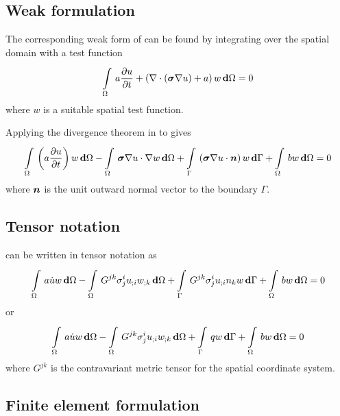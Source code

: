 \subsection{Weak formulation}

The corresponding weak form of  can be found by
integrating over the spatial domain with a test function \ie
\begin{equation}
  \gint{\Omega}{}{a\delby{u}{t}+\pbrac{\divergence{}{\pbrac{\tensor{\sigma}
          \gradient{}{u}}}+a}w}{\Omega}=0
  \label{eqn:diffusionweakform1}
\end{equation}
where $w$ is a suitable spatial test function.

Applying the divergence theorem in 
to  gives
\begin{equation}
  \gint{\Omega}{}{\pbrac{a\delby{u}{t}}w}{\Omega}-
      \gint{\Omega}{}{\dotprod{\tensor{\sigma}\gradient{}{u}}{\gradient{}{w}}}{\Omega}
      +\gint{\Gamma}{}{\pbrac{\dotprod{\tensor{\sigma}\gradient{}{u}}{\normal}}w}{\Gamma}+
      \gint{\Omega}{}{bw}{\Omega}=0
  \label{eqn:diffusionweakform2}
\end{equation}
where $\boldsymbol{n}$ is the unit outward normal vector to the boundary $\Gamma$.

\subsection{Tensor notation}

 can be written in tensor notation as
\begin{equation}
  \gint{\Omega}{}{a\dot{u}w}{\Omega}-
  \gint{\Omega}{}{G^{jk}\sigma^{i}_{j}\covarderiv{u}{i}\covarderiv{w}{k}}{\Omega}+
  \gint{\Gamma}{}{G^{jk}\sigma^{i}_{j}\covarderiv{u}{i}n_{k}w}{\Gamma} +
  \gint{\Omega}{}{bw}{\Omega}=0
  \label{eqn:diffusiontensorform1}
\end{equation}
or
\begin{equation}
  \gint{\Omega}{}{a\dot{u}w}{\Omega}-
  \gint{\Omega}{}{G^{jk}\sigma^{i}_{j}\covarderiv{u}{i}\covarderiv{w}{k}}{\Omega}+
  \gint{\Gamma}{}{qw}{\Gamma} +
  \gint{\Omega}{}{bw}{\Omega}=0
  \label{eqn:diffusiontensorform2}
\end{equation}
where $G^{jk}$ is the contravariant metric tensor for the spatial coordinate system.

\subsection{Finite element formulation}

